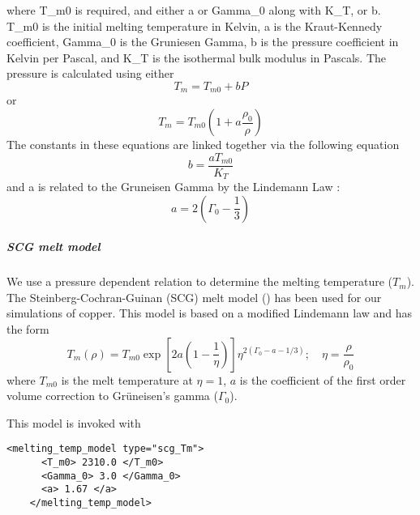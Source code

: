   where T\_m0 is required, and either a or Gamma\_0 along with K\_T, or b.  
  T\_m0 is the initial melting temperature in Kelvin, a is the Kraut-Kennedy coefficient,
  Gamma\_0 is the Gruniesen Gamma, b is the pressure coefficient in Kelvin per Pascal, and K\_T
  is the isothermal bulk modulus in Pascals.
  The pressure is calculated using either
  \begin{equation}
    T_{m}=T_{m0}+bP
  \end{equation}
  or
  \begin{equation}
    T_{m}=T_{m0}\left(1+a\frac{\rho_0}{\rho}\right)
  \end{equation}
  The constants in these equations are linked together via the following equation
  \begin{equation}
   b=\frac{aT_{m0}}{K_T}
  \end{equation}
  and a is related to the Gruneisen Gamma by the Lindemann Law \cite{Poirier91}:
  \begin{equation}
   a=2\left(\Gamma_0-\frac{1}{3}\right)
  \end{equation}

  

  \subparagraph{SCG melt model}
  We use a pressure dependent relation to determine the melting
  temperature ($T_m$).  The Steinberg-Cochran-Guinan (SCG) melt model
  (\cite{Steinberg80}) has been used for our simulations of copper.
  This model is based on a modified Lindemann law and has the form
  \begin{equation} \label{eq:TmSCG}
    T_m(\rho) = T_{m0} \exp\left[2a\left(1-\frac{1}{\eta}\right)\right]
              \eta^{2(\Gamma_0-a-1/3)}; \quad
    \eta = \frac{\rho}{\rho_0}
  \end{equation}
  where $T_{m0}$ is the melt temperature at $\eta = 1$,
  $a$ is the coefficient of the first order volume correction to
  Gr{\"u}neisen's gamma ($\Gamma_0$).

  This model is invoked with
  \begin{Verbatim}[fontsize=\footnotesize]
    <melting_temp_model type="scg_Tm">
      <T_m0> 2310.0 </T_m0>
      <Gamma_0> 3.0 </Gamma_0>
      <a> 1.67 </a>
    </melting_temp_model>
  \end{Verbatim}

